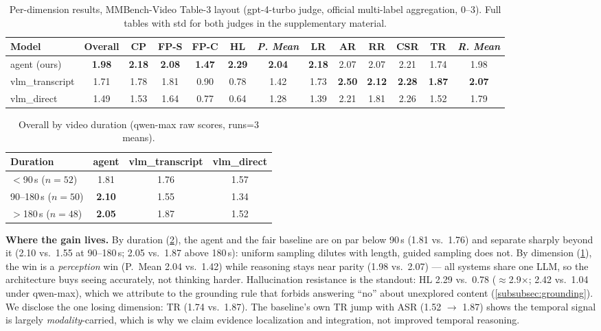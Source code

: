 \begin{table}[t]
  \centering
  \small
  \caption{Per-dimension results, MMBench-Video Table-3 layout (gpt-4-turbo judge,
  official multi-label aggregation, 0--3). Full tables with std for both judges in
  the supplementary material.}
  \label{tab:dimensions}
  \begin{tabular}{@{}lcccccccccccc@{}}
    \toprule
    Model & Overall & CP & FP-S & FP-C & HL & \emph{P. Mean} & LR & AR & RR & CSR & TR & \emph{R. Mean} \\
    \midrule
    agent (ours) & \textbf{1.98} & \textbf{2.18} & \textbf{2.08} & \textbf{1.47} & \textbf{2.29} & \textbf{2.04} & \textbf{2.18} & 2.07 & 2.07 & 2.21 & 1.74 & 1.98 \\
    vlm\_transcript & 1.71 & 1.78 & 1.81 & 0.90 & 0.78 & 1.42 & 1.73 & \textbf{2.50} & \textbf{2.12} & \textbf{2.28} & \textbf{1.87} & \textbf{2.07} \\
    vlm\_direct & 1.49 & 1.53 & 1.64 & 0.77 & 0.64 & 1.28 & 1.39 & 2.21 & 1.81 & 2.26 & 1.52 & 1.79 \\
    \bottomrule
  \end{tabular}
\end{table}

\begin{table}[t]
  \centering
  \small
  \caption{Overall by video duration (qwen-max raw scores, runs=3 means).}
  \label{tab:duration}
  \begin{tabular}{@{}lccc@{}}
    \toprule
    Duration & agent & vlm\_transcript & vlm\_direct \\
    \midrule
    $<$90\,s \hfill ($n{=}52$) & 1.81 & 1.76 & 1.57 \\
    90--180\,s \hfill ($n{=}50$) & \textbf{2.10} & 1.55 & 1.34 \\
    $>$180\,s \hfill ($n{=}48$) & \textbf{2.05} & 1.87 & 1.52 \\
    \bottomrule
  \end{tabular}
\end{table}

\textbf{Where the gain lives.} By duration (\cref{tab:duration}), the agent and
the fair baseline are on par below 90\,s (1.81 vs.\ 1.76) and separate sharply
beyond it (2.10 vs.\ 1.55 at 90--180\,s; 2.05 vs.\ 1.87 above 180\,s): uniform
sampling dilutes with length, guided sampling does not. By dimension
(\cref{tab:dimensions}), the win is a \emph{perception} win (P.\ Mean 2.04 vs.\
1.42) while reasoning stays near parity (1.98 vs.\ 2.07) --- all systems share
one LLM, so the architecture buys seeing accurately, not thinking harder.
Hallucination resistance is the standout: HL 2.29 vs.\ 0.78
($\approx$2.9$\times$; 2.42 vs.\ 1.04 under qwen-max), which we attribute to the
grounding rule that forbids answering ``no'' about unexplored content
(\cref{subsubsec:grounding}). We disclose the one losing dimension: TR (1.74 vs.\
1.87). The baseline's own TR jump with ASR (1.52 $\to$ 1.87) shows the temporal
signal is largely \emph{modality}-carried, which is why we claim evidence
localization and integration, not improved temporal reasoning.

